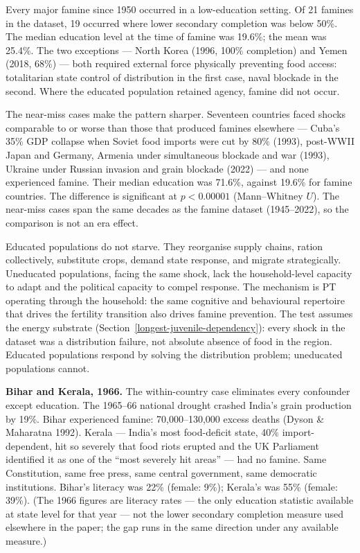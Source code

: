 \documentclass[12pt,letterpaper]{article}
\begin{document}
Every major famine since 1950 occurred in a low-education setting. Of 21 famines in the dataset, 19 occurred where lower secondary completion was below 50\%. The median education level at the time of famine was 19.6\%; the mean was 25.4\%. The two exceptions --- North Korea (1996, 100\% completion) and Yemen (2018, 68\%) --- both required external force physically preventing food access: totalitarian state control of distribution in the first case, naval blockade in the second. Where the educated population retained agency, famine did not occur.

The near-miss cases make the pattern sharper. Seventeen countries faced shocks comparable to or worse than those that produced famines elsewhere --- Cuba's 35\% GDP collapse when Soviet food imports were cut by 80\% (1993), post-WWII Japan and Germany, Armenia under simultaneous blockade and war (1993), Ukraine under Russian invasion and grain blockade (2022) --- and none experienced famine. Their median education was 71.6\%, against 19.6\% for famine countries. The difference is significant at $p < 0.00001$ (Mann--Whitney $U$). The near-miss cases span the same decades as the famine dataset (1945--2022), so the comparison is not an era effect.

Educated populations do not starve. They reorganise supply chains, ration collectively, substitute crops, demand state response, and migrate strategically. Uneducated populations, facing the same shock, lack the household-level capacity to adapt and the political capacity to compel response. The mechanism is PT operating through the household: the same cognitive and behavioural repertoire that drives the fertility transition also drives famine prevention. The test assumes the energy substrate (Section~\ref{longest-juvenile-dependency}): every shock in the dataset was a distribution failure, not absolute absence of food in the region. Educated populations respond by solving the distribution problem; uneducated populations cannot.

\textbf{Bihar and Kerala, 1966.} The within-country case eliminates every confounder except education. The 1965--66 national drought crashed India's grain production by 19\%. Bihar experienced famine: 70,000--130,000 excess deaths (Dyson \& Maharatna 1992). Kerala --- India's most food-deficit state, 40\% import-dependent, hit so severely that food riots erupted and the UK Parliament identified it as one of the ``most severely hit areas'' --- had no famine. Same Constitution, same free press, same central government, same democratic institutions. Bihar's literacy was 22\% (female: 9\%); Kerala's was 55\% (female: 39\%). (The 1966 figures are literacy rates --- the only education statistic available at state level for that year --- not the lower secondary completion measure used elsewhere in the paper; the gap runs in the same direction under any available measure.)
\end{document}
